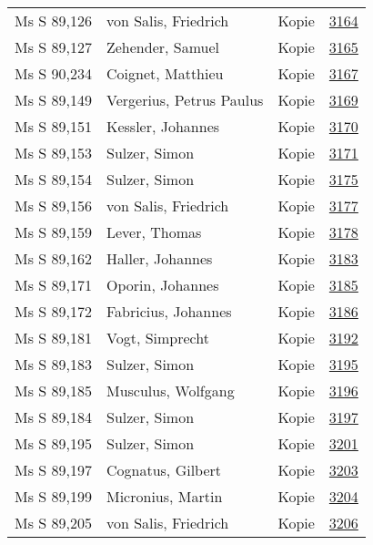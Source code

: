 \documentclass[10pt,a4paper,landscape]{report}
\begin{document}
\begin{longtable}{p{16cm}p{4cm}lr}
Ms S 89,126	&	von Salis, Friedrich	&	Kopie	&	\href{http://130.60.24.72/assignment/3164}{3164}\\
Ms S 89,127	&	Zehender, Samuel	&	Kopie	&	\href{http://130.60.24.72/assignment/3165}{3165}\\
Ms S 90,234	&	Coignet, Matthieu	&	Kopie	&	\href{http://130.60.24.72/assignment/3167}{3167}\\
Ms S 89,149	&	Vergerius, Petrus Paulus	&	Kopie	&	\href{http://130.60.24.72/assignment/3169}{3169}\\
Ms S 89,151	&	Kessler, Johannes	&	Kopie	&	\href{http://130.60.24.72/assignment/3170}{3170}\\
Ms S 89,153	&	Sulzer, Simon	&	Kopie	&	\href{http://130.60.24.72/assignment/3171}{3171}\\
Ms S 89,154	&	Sulzer, Simon	&	Kopie	&	\href{http://130.60.24.72/assignment/3175}{3175}\\
Ms S 89,156	&	von Salis, Friedrich	&	Kopie	&	\href{http://130.60.24.72/assignment/3177}{3177}\\
Ms S 89,159	&	Lever, Thomas	&	Kopie	&	\href{http://130.60.24.72/assignment/3178}{3178}\\
Ms S 89,162	&	Haller, Johannes	&	Kopie	&	\href{http://130.60.24.72/assignment/3183}{3183}\\
Ms S 89,171	&	Oporin, Johannes	&	Kopie	&	\href{http://130.60.24.72/assignment/3185}{3185}\\
Ms S 89,172	&	Fabricius, Johannes	&	Kopie	&	\href{http://130.60.24.72/assignment/3186}{3186}\\
Ms S 89,181	&	Vogt, Simprecht	&	Kopie	&	\href{http://130.60.24.72/assignment/3192}{3192}\\
Ms S 89,183	&	Sulzer, Simon	&	Kopie	&	\href{http://130.60.24.72/assignment/3195}{3195}\\
Ms S 89,185	&	Musculus, Wolfgang	&	Kopie	&	\href{http://130.60.24.72/assignment/3196}{3196}\\
Ms S 89,184	&	Sulzer, Simon	&	Kopie	&	\href{http://130.60.24.72/assignment/3197}{3197}\\
Ms S 89,195	&	Sulzer, Simon	&	Kopie	&	\href{http://130.60.24.72/assignment/3201}{3201}\\
Ms S 89,197	&	Cognatus, Gilbert	&	Kopie	&	\href{http://130.60.24.72/assignment/3203}{3203}\\
Ms S 89,199	&	Micronius, Martin	&	Kopie	&	\href{http://130.60.24.72/assignment/3204}{3204}\\
Ms S 89,205	&	von Salis, Friedrich	&	Kopie	&	\href{http://130.60.24.72/assignment/3206}{3206}\\

\end{longtable}
\end{document}
